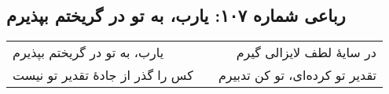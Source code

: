 \begin{center}
\section*{رباعی شماره ۱۰۷: یارب، به تو در گریختم بپذیرم}
\label{sec:107}
\begin{longtable}{l p{0.5cm} r}
یارب، به تو در گریختم بپذیرم
&&
در سایهٔ لطف لایزالی گیرم
\\
کس را گذر از جادهٔ تقدیر تو نیست
&&
تقدیر تو کرده‌ای، تو کن تدبیرم
\\
\end{longtable}
\end{center}
